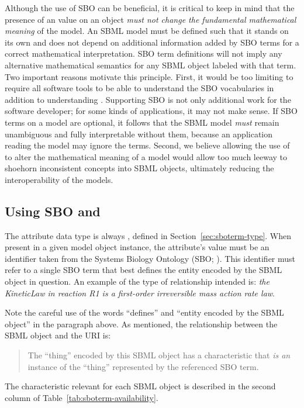 Although the use of SBO can be beneficial, it is critical to keep
in mind that the presence of an  value on an object
\emph{must not change the fundamental mathematical meaning} of the
model.  An SBML model must be defined such that it stands on its
own and does not depend on additional information added by SBO
terms for a correct mathematical interpretation.  SBO term
definitions will not imply any alternative mathematical semantics
for any SBML object labeled with that term.  Two important
reasons motivate this principle.  First, it would be too limiting
to require all software tools to be able to understand the SBO
vocabularies in addition to understanding .
Supporting SBO is not only additional work for the software
developer; for some kinds of applications, it may not make sense.
If SBO terms on a model are optional, it follows that the SBML
model \emph{must} remain unambiguous and fully interpretable
without them, because an application reading the model may ignore
the terms.  Second, we believe allowing the use of 
to alter the mathematical meaning of a model would allow
  too much leeway to shoehorn inconsistent concepts into SBML
objects, ultimately reducing the interoperability of the
models.

\subsection{Using SBO and }

The  attribute data type is always
, defined in Section~\ref{sec:sboterm-type}.
When present in a given model object instance, the
attribute's value must be an identifier taken from the
Systems Biology Ontology (SBO; \sboref).  This identifier must
refer to a single SBO term that best defines the entity encoded by
the SBML object in question.  An example of the type of
relationship intended is: \emph{the KineticLaw in reaction R1 is a
  first-order irreversible mass action rate law}.

Note the careful use of the words ``defines'' and ``entity encoded
by the SBML object'' in the paragraph above.  As mentioned, the
relationship between the SBML object and the URI is:

\begin{blockChanged}

\begin{quote}
  The ``thing'' encoded by this SBML object has a characteristic that \emph{is an} instance
  of the ``thing'' represented by the referenced SBO term.
\end{quote}

The characteristic relevant for each SBML object is described in the second column of Table~\ref{tab:sboterm-availability}.

\end{blockChanged}


